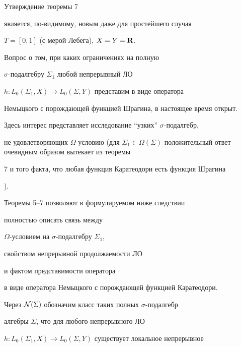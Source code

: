 \begin{note}


Утверждение теоремы 7


является, по-видимому, новым даже для простейшего случая


$T=[0,1]$ (с мерой Лебега), $X=Y={{\bold R}}$.


\end{note}





\begin{note}


Вопрос о том, при каких ограничениях на полную


$\sigma$-подал\-геб\-ру $\Sigma_1$ любой непрерывный ЛО


$h:L_0(\Sigma_1,X)\to L_0(\Sigma,Y)$ представим в виде оператора


Немыцкого с порождающей функцией Шрагина, в настоящее время открыт.


Здесь интерес представляет исследование ``узких'' $\sigma$-подал\-гебр,


не удовлетворяющих ${\Omega}$-ус\-ло\-вию (для $\Sigma_1\in


{\Omega}(\Sigma)$ положительный ответ очевидным образом вытекает из теоремы


7 и того факта, что любая функция Каратеодори есть функция Шрагина


\cite{32}).


\end{note}





Теоремы 5--7 позволяют в формулируемом ниже следствии


полностью описать связь между


$\Omega$-ус\-ло\-ви\-ем на $\sigma$-подал\-гебру $\Sigma_1$,


свойством непрерывной продолжаемости ЛО


и фактом представимости оператора


в виде оператора Немыцкого с порождающей функцией Каратеодори.





Через ${\cal N}(\Sigma)$ обозначим класс таких полных $\sigma$-подал\-гебр


алгебры $\Sigma$, что для любого непрерывного ЛО


$h:L_0(\Sigma_1,X)\to L_0(\Sigma,Y)$ существует локальное непрерывное


